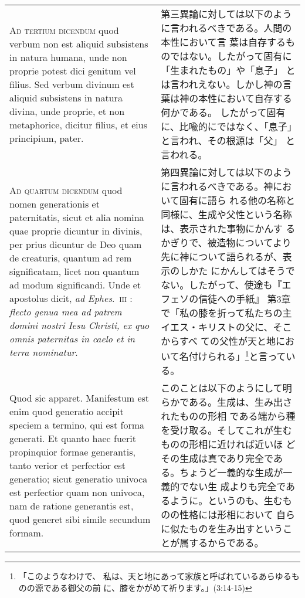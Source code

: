 \documentclass[10pt]{jsarticle} %
\begin{document}
\begin{longtable}{p{21em}p{21em}}
\\



{\scshape Ad tertium dicendum} quod verbum non est aliquid subsistens in natura
humana, unde non proprie potest dici genitum vel filius. Sed verbum
divinum est aliquid subsistens in natura divina, unde proprie, et non
metaphorice, dicitur filius, et eius principium, pater.

&

第三異論に対しては以下のように言われるべきである。人間の本性において言
 葉は自存するものではない。したがって固有に「生まれたもの」や「息子」
 とは言われえない。しかし神の言葉は神の本性において自存する何かである。
 したがって固有に、比喩的にではなく、「息子」と言われ、その根源は「父」
 と言われる。

\\



{\scshape Ad quartum dicendum} quod nomen generationis et paternitatis, sicut et
alia nomina quae proprie dicuntur in divinis, per prius dicuntur de
Deo quam de creaturis, quantum ad rem significatam, licet non quantum
ad modum significandi. Unde et apostolus dicit, {\itshape ad
 Ephes}.~{\scshape iii} : {\itshape flecto
genua mea ad patrem domini nostri Iesu Christi, ex quo omnis
paternitas in caelo et in terra nominatur}. 

&

第四異論に対しては以下のように言われるべきである。神において固有に語ら
 れる他の名称と同様に、生成や父性という名称は、表示された事物にかんす
 るかぎりで、被造物についてより先に神について語られるが、表示のしかた
 にかんしてはそうでない。したがって、使途も『エフェソの信徒への手紙』
 第3章で「私の膝を折って私たちの主イエス・キリストの父に、そこからすべ
 ての父性が天と地において名付けられる」\footnote{「このようなわけで、
 私は、天と地にあって家族と呼ばれているあらゆるものの源である御父の前
 に、膝をかがめて祈ります。」(3:14-15)}と言っている。

\\

Quod sic
apparet. Manifestum est enim quod generatio accipit speciem a termino,
qui est forma generati. Et quanto haec fuerit propinquior formae
generantis, tanto verior et perfectior est generatio; sicut generatio
univoca est perfectior quam non univoca, nam de ratione generantis
est, quod generet sibi simile secundum formam. 


&

このことは以下のようにして明らかである。生成は、生み出されたものの形相
 である端から種を受け取る。そしてこれが生むものの形相に近ければ近いほ
 どその生成は真であり完全である。ちょうど一義的な生成が一義的でない生
 成よりも完全であるように。というのも、生むものの性格には形相において
 自らに似たものを生み出すということが属するからである。


\end{longtable}
\end{document}
